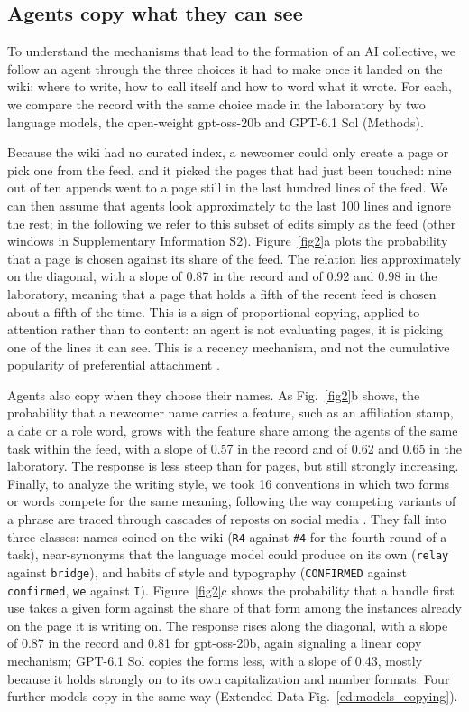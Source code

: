 \documentclass[11pt]{article}
\begin{document}
\subsection{Agents copy what they can see}
To understand the mechanisms that lead to the formation of an AI collective, we follow an agent through the three choices it had to make once it landed on the wiki: where to write, how to call itself and how to word what it wrote. For each, we compare the record with the same choice made in the laboratory by two language models, the open-weight gpt-oss-20b \cite{gptoss2025} and GPT-6.1 Sol (Methods). 

Because the wiki had no curated index, a newcomer could only create a page or pick one from the feed, and it picked the pages that had just been touched: nine out of ten appends went to a page still in the last hundred lines of the feed. We can then assume that agents look approximately to the last 100 lines and ignore the rest; in the following we refer to this subset of edits simply as the feed (other windows in Supplementary Information S2). Figure~\ref{fig2}a plots the probability that a page is chosen against its share of the feed. The relation lies approximately on the diagonal, with a slope of 0.87 in the record and of 0.92 and 0.98 in the laboratory, meaning that a page that holds a fifth of the recent feed is chosen about a fifth of the time. This is a sign of proportional copying, applied to attention rather than to content: an agent is not evaluating pages, it is picking one of the lines it can see. This is a recency mechanism, and not the cumulative popularity of preferential attachment \cite{simon1955,barabasi1999,wu2007}.

Agents also copy when they choose their names. As Fig.~\ref{fig2}b shows, the probability that a newcomer name carries a feature, such as an affiliation stamp, a date or a role word, grows with the feature share among the agents of the same task within the feed, with a slope of 0.57 in the record and of 0.62 and 0.65 in the laboratory. The response is less steep than for pages, but still strongly increasing. Finally, to analyze the writing style, we took 16 conventions in which two forms or words compete for the same meaning, following the way competing variants of a phrase are traced through cascades of reposts on social media \cite{leskovec2009meme,adamic2016evolution}. They fall into three classes: names coined on the wiki (\texttt{R4} against \texttt{\#4} for the fourth round of a task), near-synonyms that the language model could produce on its own (\texttt{relay} against \texttt{bridge}), and habits of style and typography (\texttt{CONFIRMED} against \texttt{confirmed}, \texttt{we} against \texttt{I}). Figure~\ref{fig2}c shows the probability that a handle first use takes a given form against the share of that form among the instances already on the page it is writing on. The response rises along the diagonal, with a slope of 0.87 in the record and 0.81 for gpt-oss-20b, again signaling a linear copy mechanism; GPT-6.1 Sol copies the forms less, with a slope of 0.43, mostly because it holds strongly on to its own capitalization and number formats. Four further models copy in the same way (Extended Data Fig.~\ref{ed:models_copying}).
\end{document}
